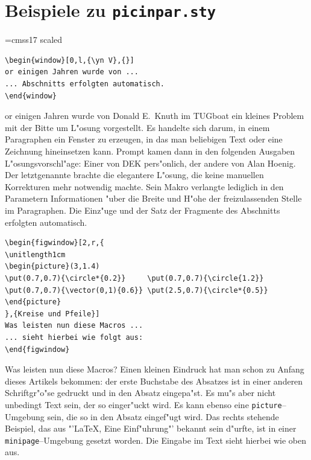 \documentclass[a4paper]{article}
\begin{document}
\section*{Beispiele zu {\tt picinpar.sty}}
\font\yn=cmss17 scaled  %
\begin{verbatim}
\begin{window}[0,l,{\yn V},{}]
or einigen Jahren wurde von ...
... Abschnitts erfolgten automatisch.
\end{window}
\end{verbatim}

\begin{window}[0,l,{\yn V},{}]
or einigen Jahren wurde von Donald E.~Knuth im TUGboat ein kleines
Problem mit der Bitte um L"osung vorgestellt. Es handelte sich darum,
in einem Paragraphen ein Fenster zu erzeugen, in das man beliebigen Text
oder eine Zeichnung hineinsetzen kann. Prompt kamen dann in den folgenden
Ausgaben L"osungsvorschl"age: Einer von DEK pers"onlich, der andere von
Alan Hoenig. Der letztgenannte brachte die elegantere L"osung, die keine
manuellen Korrekturen mehr notwendig machte. Sein Makro verlangte lediglich
in den Parametern Informationen "uber die Breite und H"ohe der
freizulassenden Stelle im Paragraphen. Die Einz"uge und der Satz der
Fragmente des Abschnitts erfolgten automatisch.
\end{window}

\begin{verbatim}
\begin{figwindow}[2,r,{
\unitlength1cm
\begin{picture}(3,1.4)
\put(0.7,0.7){\circle*{0.2}}     \put(0.7,0.7){\circle{1.2}}
\put(0.7,0.7){\vector(0,1){0.6}} \put(2.5,0.7){\circle*{0.5}}
\end{picture}
},{Kreise und Pfeile}]
Was leisten nun diese Macros ...
... sieht hierbei wie folgt aus:
\end{figwindow}
\end{verbatim}

\begin{figwindow}
Was leisten nun diese Macros? Einen kleinen Eindruck hat man schon
zu Anfang dieses Artikels bekommen: der erste Buchstabe des Absatzes
ist in einer anderen Schriftgr"o"se gedruckt und in den Absatz eingepa"st.
Es mu"s aber nicht unbedingt Text sein, der so einger"uckt wird. Es kann
ebenso eine \verb?picture?--Umgebung sein, die so in den Absatz eingef"ugt
wird. Das rechts stehende Beispiel, das aus "'\LaTeX , Eine Einf"uhrung"'
bekannt sein d"urfte, ist in einer \verb?minipage?--Umgebung gesetzt
worden. Die Eingabe im Text sieht hierbei wie oben aus.
\end{figwindow}
\end{document}
